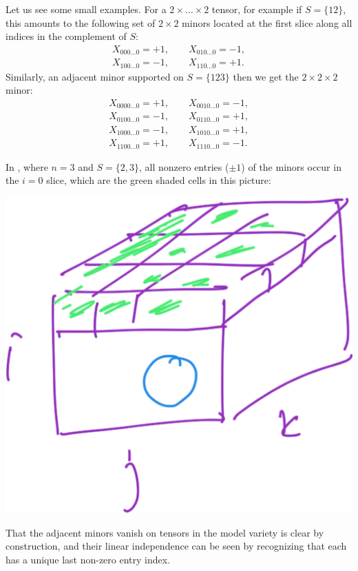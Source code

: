 \documentclass[12pt]{extarticle}
\theoremstyle{definition}
\numberwithin{theorem}{section}
\begin{document}
Let us see some small examples. 
For a $2\times\dots\times2$ tensor, for example if $S=\{12\}$, this amounts to the following set of  $2\times 2$ minors
 located at the  first slice along all indices in the complement of $S$: 
\begin{align*}
	X_{000\dots0} = +1, \qquad X_{010\dots0} =-1,\\ 
	X_{100\dots0} =-1, \qquad 	X_{110\dots0}  =+1.
\end{align*}
Similarly, an adjacent minor supported on $S=\{123\}$ then we get the $2\times2\times2$ minor: 
\begin{align*}
	X_{0000\dots0} = +1, \qquad X_{0010\dots0} =-1,\\ 
	X_{0100\dots0} = -1, \qquad X_{0110\dots0} =+1,\\ 
	X_{1000\dots0} = -1, \qquad X_{1010\dots0} =+1,\\ 	
	X_{1100\dots0} =+1, \qquad 	X_{1110\dots0}  =-1.
\end{align*}

In \cite[Example 2.4]{HoSu02}, where $n=3$ and $S=\{2,3\}$, all nonzero entries ($\pm 1$) of the minors occur in the $i=0$ slice, which are the green shaded cells in this picture: 

\includegraphics[scale=0.05]{smallBox.PNG}

That the adjacent minors vanish on tensors in the model variety is clear by construction, and their linear independence can be seen by recognizing that each has a unique last non-zero entry index. 
\end{document}
